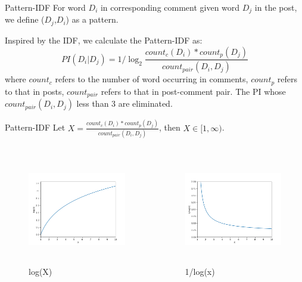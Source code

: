 \documentclass[aspectratio=169]{beamer} %
\begin{document}
    \begin{frame}{Pattern-IDF}
      For word $D_i$ in corresponding comment given word $D_j$ in the post, we define ($D_j$,$D_i$) as a pattern.

      Inspired by the IDF, we calculate the Pattern-IDF as:
      \begin{equation}
        PI(D_i|D_j) = 1 / \log_2{\frac{count_c(D_i) * count_p(D_j)}{count_{pair}(D_i, D_j)}}
      \end{equation}
      where $count_c$ refers to the number of word occurring in comments, $count_p$ refers to that in posts, $count_{pair}$ refers to that in post-comment pair. The PI whose $count_{pair}(D_i, D_j)$ less than 3 are eliminated.

    \end{frame}

    \begin{frame}{Pattern-IDF}
      Let $X = \frac{count_c(D_i) * count_p(D_j)}{count_{pair}(D_i, D_j)}$, then $X \in [1, \infty)$.
      \begin{columns}[T] %
      \begin{column}{.48\textwidth}
      
      \begin{figure}
      \includegraphics[width=6.4cm,height=4.8cm]{pi1.png}
      \caption{log(X)}
      \end{figure}
      
      \end{column}%
      \hfill%
      \begin{column}{.48\textwidth}
      
        \begin{figure}
        \includegraphics[width=6.4cm,height=4.8cm]{pi2.png}
        \caption{1/log(x)}
        \end{figure}

      \end{column}%
      \end{columns}
    \end{frame}
\end{document}
